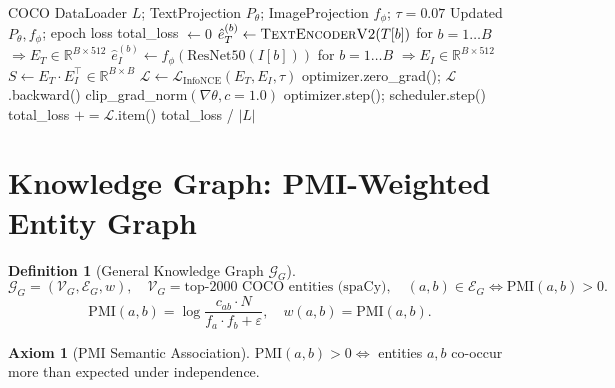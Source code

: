 \documentclass[12pt,a4paper]{article}
\theoremstyle{definition}
\newtheorem{definition}{Definition}[section]
\newtheorem{axiom}{Axiom}[section]
\theoremstyle{plain}
\theoremstyle{remark}
\newcommand{\R}{\mathbb{R}}
\newcommand{\KG}{\mathcal{G}}
\begin{document}
\begin{algorithm}[H]
\caption{Pipeline A Training Epoch}
\label{alg:trainepoch_A}
\begin{algorithmic}[1]
\Require COCO DataLoader $L$; TextProjection $P_\theta$; ImageProjection $f_\phi$; $\tau = 0.07$
\Ensure Updated $P_\theta, f_\phi$; epoch loss
\State total\_loss $\gets 0$
  \State $\hat{e}_T^{(b)} \gets \textsc{TextEncoderV2}(T[b])$ for $b=1\ldots B$ \quad $\Rightarrow E_T \in \R^{B \times 512}$
  \State $\hat{e}_I^{(b)} \gets f_\phi(\text{ResNet50}(I[b]))$ for $b=1\ldots B$ \quad $\Rightarrow E_I \in \R^{B \times 512}$
  \State $S \gets E_T \cdot E_I^\top \in \R^{B \times B}$
  \State $\mathcal{L} \gets \mathcal{L}_{\text{InfoNCE}}(E_T, E_I, \tau)$
  \State optimizer.zero\_grad(); $\mathcal{L}$.backward()
  \State clip\_grad\_norm$(\nabla\theta, c=1.0)$
  \State optimizer.step(); scheduler.step()
  \State total\_loss $\mathrel{+}= \mathcal{L}$.item()
\EndFor
\State \Return total\_loss / $|L|$
\end{algorithmic}
\end{algorithm}

\newpage
\section{Knowledge Graph: PMI-Weighted Entity Graph}
\label{sec:kg}

\begin{definition}[General Knowledge Graph $\KG_G$]
\[
  \KG_G = (\mathcal{V}_G, \mathcal{E}_G, w), \quad
  \mathcal{V}_G = \text{top-2000 COCO entities (spaCy)}, \quad
  (a,b) \in \mathcal{E}_G \Leftrightarrow \text{PMI}(a,b) > 0.
\]
\[
  \text{PMI}(a,b) = \log\frac{c_{ab} \cdot N}{f_a \cdot f_b + \varepsilon}, \quad w(a,b) = \text{PMI}(a,b).
\]
\end{definition}

\begin{axiom}[PMI Semantic Association]
$\text{PMI}(a,b) > 0 \Leftrightarrow$ entities $a, b$ co-occur more than expected under independence.
\end{axiom}
\end{document}
